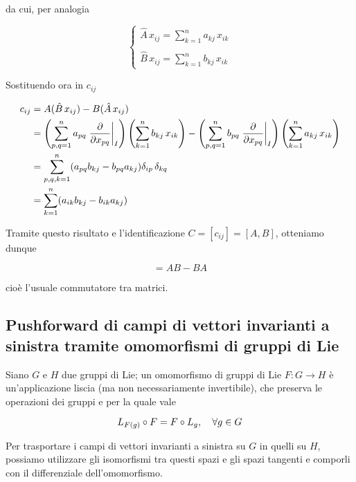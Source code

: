 da cui, per analogia

\begin{equation}
	\begin{cases}
		\hat{A} \, x_{ij} = \displaystyle\sum_{k=1}^{n} a_{kj} \, x_{ik} \\\\
		\hat{B} \, x_{ij} = \displaystyle\sum_{k=1}^{n} b_{kj} \, x_{ik}
	\end{cases}
\end{equation}

Sostituendo ora in $ c_{ij} $

\begin{align}
	\begin{split}
		c_{ij} &= A (\hat{B} \, x_{ij}) - B (\hat{A} \, x_{ij}) \\
		&= \left( \sum_{p,q=1}^{n} a_{pq} \eval{ \pdv{x_{pq}} }_{I} \right) \left( \sum_{k=1}^{n} b_{kj} \, x_{ik} \right) - \left( \sum_{p,q=1}^{n} b_{pq} \eval{ \pdv{x_{pq}} }_{I} \right) \left( \sum_{k=1}^{n} a_{kj} \, x_{ik} \right) \\
		&= \sum_{p,q,k=1}^{n} ( a_{pq} b_{kj} - b_{pq} a_{kj} ) \delta_{ip} \, \delta_{kq} \\
		&= \sum_{k=1}^{n} ( a_{ik} b_{kj} - b_{ik} a_{kj} )
	\end{split}
\end{align}

Tramite questo risultato e l'identificazione $ C = [c_{ij}] = [A,B] $, otteniamo dunque

\begin{equation}
	[A,B] = A B - B A
\end{equation}

cioè l'usuale commutatore tra matrici.

\subsection{Pushforward di campi di vettori invarianti a sinistra tramite omomorfismi di gruppi di Lie}

Siano $ G $ e $ H $ due gruppi di Lie; un omomorfismo di gruppi di Lie $ F : G \to H $ è un'applicazione liscia (ma non necessariamente invertibile), che preserva le operazioni dei gruppi e per la quale vale

\begin{equation}
	L_{F(g)} \circ F = F \circ L_{g} \qcomma \forall g \in G
\end{equation}

Per trasportare i campi di vettori invarianti a sinistra su $ G $ in quelli su $ H $, possiamo utilizzare gli isomorfismi tra questi spazi e gli spazi tangenti e comporli con il differenziale dell'omomorfismo.

